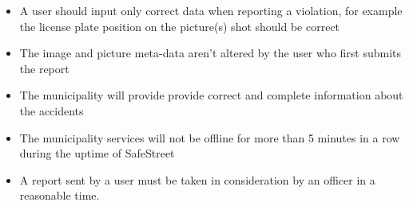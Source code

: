 \begin{itemize}

\item A user should input only correct data when reporting a violation, for example the license plate position on the picture(s) shot should be correct

\item The image and picture meta-data aren't altered by the user who first submits the report

\item The municipality will provide provide correct and complete information 
about the accidents

\item The municipality services will not be offline for more than 5 minutes in a row during the uptime of SafeStreet
\item A report sent by a user must be taken in consideration by an officer in a reasonable time.

\end{itemize}